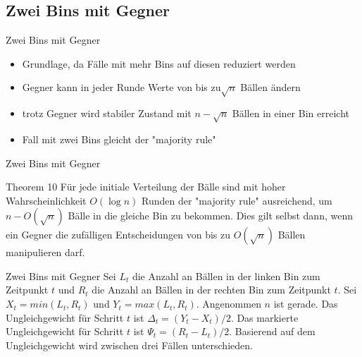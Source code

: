 \documentclass{beamer}
\begin{document}
    \subsection{Zwei Bins mit Gegner}
    \begin{frame}{Zwei Bins mit Gegner}
        \begin{itemize}
            \item Grundlage, da Fälle mit mehr Bins auf diesen reduziert werden
            \vfill
            \item Gegner kann in jeder Runde Werte von bis zu\(\sqrt{n}\) Bällen
                  ändern
            \vfill
            \item trotz Gegner wird stabiler Zustand mit \(n - \sqrt{n}\) Bällen
                  in einer Bin erreicht
            \vfill
            \item Fall mit zwei Bins gleicht der "majority rule"
        \end{itemize}
    \end{frame}

    \begin{frame}{Zwei Bins mit Gegner}
        \begin{block}{Theorem 10}
            Für jede initiale Verteilung der Bälle sind mit hoher Wahrscheinlichkeit
            \(O(\log n)\) Runden der "majority rule" ausreichend, um
            \(n - O(\sqrt{n})\) Bälle in die gleiche Bin zu bekommen.
            Dies gilt selbst dann, wenn ein Gegner die zufälligen Entscheidungen
            von bis zu \(O(\sqrt{n})\) Bällen manipulieren darf.
        \end{block}
    \end{frame}
    \begin{frame}{Zwei Bins mit Gegner}
        Sei \(L_t\) die Anzahl an Bällen in der linken Bin zum Zeitpunkt \(t\)
        und \(R_t\) die Anzahl an Bällen in der rechten Bin zum Zeitpunkt \(t\).
        Sei \(X_t = min(L_t, R_t)\) und \(Y_t = max(L_t, R_t)\). Angenommen \(n\)
        ist gerade. Das Ungleichgewicht für Schritt \(t\) ist
        \(\Delta_t = (Y_t - X_t) /2\). Das markierte Ungleichgewicht für Schritt
        \(t\) ist \(\Psi_t = (R_t - L_t)/2\).
        Basierend auf dem Ungleichgewicht wird zwischen drei Fällen unterschieden.
    \end{frame}
\end{document}
